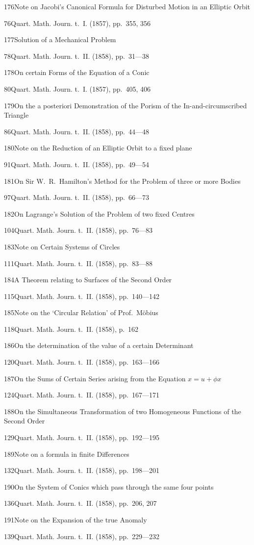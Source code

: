 \documentclass[11pt,a4paper]{book}
\providecommand{\tocentry}[2]{#1\dotfill #2\par}
\begin{document}
\tocentry{176}{Note on Jacobi's Canonical Formula for Disturbed Motion in an Elliptic Orbit}{76}{Quart. Math. Journ. t.~I. (1857), pp.~355, 356}

\tocentry{177}{Solution of a Mechanical Problem}{78}{Quart. Math. Journ. t.~II. (1858), pp.~31---38}

\tocentry{178}{On certain Forms of the Equation of a Conic}{80}{Quart. Math. Journ. t.~I. (1857), pp.~405, 406}

\tocentry{179}{On the a posteriori Demonstration of the Porism of the In-and-circumscribed Triangle}{86}{Quart. Math. Journ. t.~II. (1858), pp.~44---48}

\tocentry{180}{Note on the Reduction of an Elliptic Orbit to a fixed plane}{91}{Quart. Math. Journ. t.~II. (1858), pp.~49---54}

\tocentry{181}{On Sir W.~R.~Hamilton's Method for the Problem of three or more Bodies}{97}{Quart. Math. Journ. t.~II. (1858), pp.~66---73}

\tocentry{182}{On Lagrange's Solution of the Problem of two fixed Centres}{104}{Quart. Math. Journ. t.~II. (1858), pp.~76---83}

\tocentry{183}{Note on Certain Systems of Circles}{111}{Quart. Math. Journ. t.~II. (1858), pp.~83---88}

\tocentry{184}{A Theorem relating to Surfaces of the Second Order}{115}{Quart. Math. Journ. t.~II. (1858), pp.~140---142}

\tocentry{185}{Note on the `Circular Relation' of Prof.~M\"{o}bius}{118}{Quart. Math. Journ. t.~II. (1858), p.~162}

\newpage

\tocentry{186}{On the determination of the value of a certain Determinant}{120}{Quart. Math. Journ. t.~II. (1858), pp.~163---166}

\tocentry{187}{On the Sums of Certain Series arising from the Equation $x = u + \phi x$}{124}{Quart. Math. Journ. t.~II. (1858), pp.~167---171}

\tocentry{188}{On the Simultaneous Transformation of two Homogeneous Functions of the Second Order}{129}{Quart. Math. Journ. t.~II. (1858), pp.~192---195}

\tocentry{189}{Note on a formula in finite Differences}{132}{Quart. Math. Journ. t.~II. (1858), pp.~198---201}

\tocentry{190}{On the System of Conics which pass through the same four points}{136}{Quart. Math. Journ. t.~II. (1858), pp.~206, 207}

\tocentry{191}{Note on the Expansion of the true Anomaly}{139}{Quart. Math. Journ. t.~II. (1858), pp.~229---232}
\end{document}
